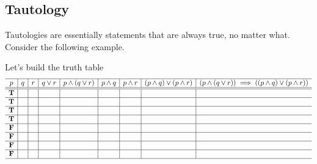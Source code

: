 \subsection*{Tautology}
Tautologies are essentially statements that are always true, no matter what.  Consider the following example.
\begin{example}
Let's build the truth table 
\[   \begin{array}{c|c|c|c|c|c|c|c|c}
  \hline  
  p 			& q 				& r				& q \lor r & p \land (q \lor r)	& p \land q	& p \land r&( p \land q) \lor (p\land r) &(p \land (q \lor r))\implies (( p \land q) \lor (p\land r)) \\
  \hline
  \hline
 \mathbf{T} &   	&   	&   	&   	& 	&	& & \\
  \hline
 \mathbf{T} &   	&    	&   	&   	& 	& 	& & \\
  \hline
 \mathbf{T} &   	&    	&   	&   	& 	& 	& & \\
  \hline
 \mathbf{T} &   	&    	&   	&   	&  	&	&  &  \\
\hline
 \mathbf{F} &   	&   	&   	&   	& 	&  & & \\
  \hline
 \mathbf{F} &   	&    	&   	&   	& 	& 	& &  \\
  \hline
 \mathbf{F} &   	&    	&   	&   	&  	&  	&  &  \\
  \hline
 \mathbf{F} &   	&    	&   	&   	& 	&  	& &  \\
    \hline
    \end{array}\]
    

\end{example}

